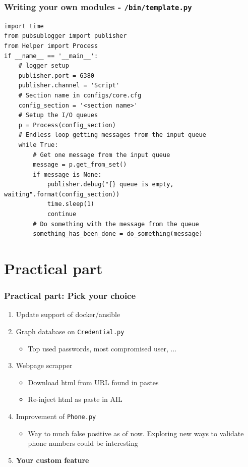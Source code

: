 \documentclass{beamer}
\begin{document}
\lstset{style=code}
\begin{frame}[fragile]
    \frametitle{Writing your own modules - \texttt{/bin/template.py}}
    \begin{lstlisting}
import time
from pubsublogger import publisher
from Helper import Process
if __name__ == '__main__':
    # logger setup
    publisher.port = 6380
    publisher.channel = 'Script'
    # Section name in configs/core.cfg
    config_section = '<section name>'
    # Setup the I/O queues
    p = Process(config_section)
    # Endless loop getting messages from the input queue
    while True:
        # Get one message from the input queue
        message = p.get_from_set()
        if message is None:
            publisher.debug("{} queue is empty, waiting".format(config_section))
            time.sleep(1)
            continue
        # Do something with the message from the queue
        something_has_been_done = do_something(message)
    \end{lstlisting}
\end{frame}

\section{Practical part}
\begin{frame}
    \frametitle{Practical part: Pick your choice}

    \begin{enumerate}
        \item Update support of docker/ansible
        \item Graph database on \texttt{Credential.py}
        \begin{itemize}
            \item Top used passwords, most compromised user, ...
        \end{itemize}
        \item Webpage scrapper
        \begin{itemize}
            \item Download html from URL found in pastes
            \item Re-inject html as paste in AIL
        \end{itemize}
    \item Improvement of \texttt{Phone.py}
        \begin{itemize}
            \item Way to much false positive as of now. Exploring new ways to validate phone numbers could be interesting
        \end{itemize}

        \item \textbf{Your custom feature}
    \end{enumerate}
\end{frame}
\end{document}
